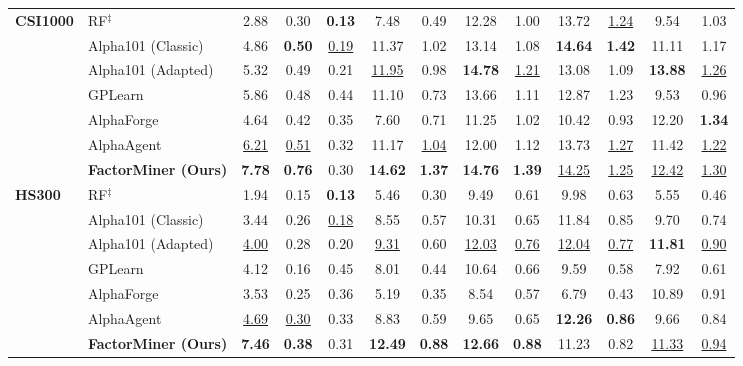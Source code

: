 \begin{table}[t]
\begin{tabular}{ll ccc cccc cccc}
    \midrule
    \multirow{7}{*}{\textbf{CSI1000}}
    & RF$^\ddagger$ & 2.88 & 0.30 & \textbf{0.13} & 7.48 & 0.49 & 12.28 & 1.00 & 13.72 & \underline{1.24} & 9.54 & 1.03 \\
    & Alpha101 (Classic) & 4.86 & \textbf{0.50} & \underline{0.19} & 11.37 & 1.02 & 13.14 & 1.08 & \textbf{14.64} & \textbf{1.42} & 11.11 & 1.17 \\
    & Alpha101 (Adapted) & 5.32 & 0.49 & 0.21 & \underline{11.95} & 0.98 & \textbf{14.78} & \underline{1.21} & 13.08 & 1.09 & \textbf{13.88} & \underline{1.26} \\
    & GPLearn & 5.86 & 0.48 & 0.44 & 11.10 & 0.73 & 13.66 & 1.11 & 12.87 & 1.23 & 9.53 & 0.96 \\
    & AlphaForge & 4.64 & 0.42 & 0.35 & 7.60 & 0.71 & 11.25 & 1.02 & 10.42 & 0.93 & 12.20 & \textbf{1.34} \\
    & AlphaAgent & \underline{6.21} & \underline{0.51} & 0.32 & 11.17 & \underline{1.04} & 12.00 & 1.12 & 13.73 & \underline{1.27} & 11.42 & \underline{1.22} \\
    & \textbf{FactorMiner (Ours)} & \textbf{7.78} & \textbf{0.76} & 0.30 & \textbf{14.62} & \textbf{1.37} & \textbf{14.76} & \textbf{1.39} & \underline{14.25} & \underline{1.25} & \underline{12.42} & \underline{1.30} \\
    \midrule
    \multirow{7}{*}{\textbf{HS300}}
    & RF$^\ddagger$ & 1.94 & 0.15 & \textbf{0.13} & 5.46 & 0.30 & 9.49 & 0.61 & 9.98 & 0.63 & 5.55 & 0.46 \\
    & Alpha101 (Classic) & 3.44 & 0.26 & \underline{0.18} & 8.55 & 0.57 & 10.31 & 0.65 & 11.84 & 0.85 & 9.70 & 0.74 \\
    & Alpha101 (Adapted) & \underline{4.00} & 0.28 & 0.20 & \underline{9.31} & 0.60 & \underline{12.03} & \underline{0.76} & \underline{12.04} & \underline{0.77} & \textbf{11.81} & \underline{0.90} \\
    & GPLearn & 4.12 & 0.16 & 0.45 & 8.01 & 0.44 & 10.64 & 0.66 & 9.59 & 0.58 & 7.92 & 0.61 \\
    & AlphaForge & 3.53 & 0.25 & 0.36 & 5.19 & 0.35 & 8.54 & 0.57 & 6.79 & 0.43 & 10.89 & 0.91 \\
    & AlphaAgent & \underline{4.69} & \underline{0.30} & 0.33 & 8.83 & 0.59 & 9.65 & 0.65 & \textbf{12.26} & \textbf{0.86} & 9.66 & 0.84 \\
    & \textbf{FactorMiner (Ours)} & \textbf{7.46} & \textbf{0.38} & 0.31 & \textbf{12.49} & \textbf{0.88} & \textbf{12.66} & \textbf{0.88} & 11.23 & 0.82 & \underline{11.33} & \underline{0.94} \\

\end{tabular}
\end{table}
